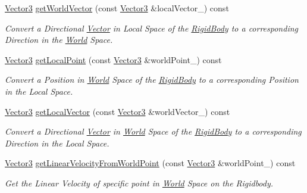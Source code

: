 \begin{DoxyCompactItemize}
\hyperlink{class_i_dream_sky_1_1_vector3}{Vector3} \hyperlink{class_i_dream_sky_1_1_physics3_1_1_vehicle_a13be235975379d4d046e81800318024c}{get\+World\+Vector} (const \hyperlink{class_i_dream_sky_1_1_vector3}{Vector3} \&local\+Vector\+\_\+) const 
\begin{DoxyCompactList}\small\item\em Convert a Directional \hyperlink{class_i_dream_sky_1_1_vector}{Vector} in Local Space of the \hyperlink{class_i_dream_sky_1_1_physics3_1_1_rigid_body}{Rigid\+Body} to a corresponding Direction in the \hyperlink{class_i_dream_sky_1_1_physics3_1_1_world}{World} Space. \end{DoxyCompactList}\item 
\hyperlink{class_i_dream_sky_1_1_vector3}{Vector3} \hyperlink{class_i_dream_sky_1_1_physics3_1_1_vehicle_a67a893f1d848921f4822ab2ee0c6301d}{get\+Local\+Point} (const \hyperlink{class_i_dream_sky_1_1_vector3}{Vector3} \&world\+Point\+\_\+) const 
\begin{DoxyCompactList}\small\item\em Convert a Position in \hyperlink{class_i_dream_sky_1_1_physics3_1_1_world}{World} Space of the \hyperlink{class_i_dream_sky_1_1_physics3_1_1_rigid_body}{Rigid\+Body} to a corresponding Position in the Local Space. \end{DoxyCompactList}\item 
\hyperlink{class_i_dream_sky_1_1_vector3}{Vector3} \hyperlink{class_i_dream_sky_1_1_physics3_1_1_vehicle_aa6854831aa3ac8256c3674aa8722db12}{get\+Local\+Vector} (const \hyperlink{class_i_dream_sky_1_1_vector3}{Vector3} \&world\+Vector\+\_\+) const 
\begin{DoxyCompactList}\small\item\em Convert a Directional \hyperlink{class_i_dream_sky_1_1_vector}{Vector} in \hyperlink{class_i_dream_sky_1_1_physics3_1_1_world}{World} Space of the \hyperlink{class_i_dream_sky_1_1_physics3_1_1_rigid_body}{Rigid\+Body} to a corresponding Direction in the Local Space. \end{DoxyCompactList}\item 
\hyperlink{class_i_dream_sky_1_1_vector3}{Vector3} \hyperlink{class_i_dream_sky_1_1_physics3_1_1_vehicle_ad6dabcfd3e970334613def0025cf7dbb}{get\+Linear\+Velocity\+From\+World\+Point} (const \hyperlink{class_i_dream_sky_1_1_vector3}{Vector3} \&world\+Point\+\_\+) const 
\begin{DoxyCompactList}\small\item\em Get the Linear Velocity of specific point in \hyperlink{class_i_dream_sky_1_1_physics3_1_1_world}{World} Space on the Rigidbody. \end{DoxyCompactList}\item 

\end{DoxyCompactItemize}
